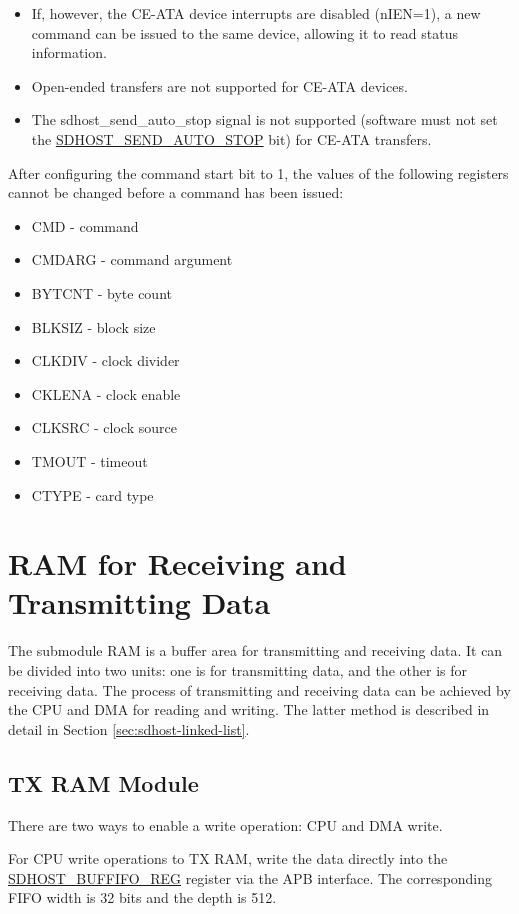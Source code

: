 \documentclass[main\_\_EN.tex]{subfiles}
\begin{document}
\begin{itemize}
	\item If, however, the CE-ATA device interrupts are disabled (nIEN=1), a new command can be issued to the same device, allowing it to read status information. 
	\item Open-ended transfers are not supported for CE-ATA devices.
	\item The sdhost\_send\_auto\_stop signal is not supported (software must not set the \hyperref[fielddesc:SDHOSTSENDAUTOSTOP]{SDHOST\_SEND\_AUTO\_STOP} bit) for CE-ATA transfers.
\end{itemize}

After configuring the command start bit to 1, the values of the following registers cannot be changed before a command has been issued: 

\begin{itemize}
	\item CMD - command
	\item CMDARG -  command argument
	\item BYTCNT -  byte count
	\item BLKSIZ -  block size
	\item CLKDIV -  clock divider
	\item CKLENA -  clock enable
	\item CLKSRC -  clock source
	\item TMOUT -   timeout
	\item CTYPE -   card type
\end{itemize}

\section{RAM for Receiving and Transmitting Data}

The submodule RAM is a buffer area for transmitting and receiving data. It can be divided into two units: one is for transmitting data, and the other is for receiving data. The process of transmitting and receiving data can be achieved by the CPU and DMA for reading and writing. The latter method is described in detail in Section \ref{sec:sdhost-linked-list}.

\subsection{TX RAM Module}

There are two ways to enable a write operation: CPU and DMA write.

For CPU write operations  to TX RAM, write the data directly into the \hyperref[fielddesc:SDHOSTBUFFIFOREG]{\hyperref[regdesc:SDHOSTBUFFIFOREG]{SDHOST\_BUFFIFO\_REG}} register via the APB interface. The corresponding FIFO width is 32 bits and the depth is 512.
\end{document}
